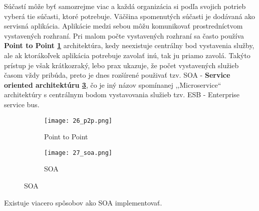 Súčastí môže byť samozrejme viac a každá organizácia si podľa svojich potrieb vyberá tie  súčasti, ktoré potrebuje. Väčšina spomenutých súčasti je dodávaná ako servisná aplikácia. Aplikácie medzi sebou môžu komunikovať prostredníctvom vystavených rozhraní. Pri malom počte vystavených rozhraní sa často používa \textbf{Point to Point \ref{26_p2p}} architektúra, kedy neexistuje centrálny bod vystavenia služby, ale ak ktorákoľvek aplikácia potrebuje zavolať inú, tak ju priamo zavolá. Takýto prístup je však krátkozraký, lebo prax ukazuje, že počet vystavených služieb časom vždy pribúda, preto je dnes rozšírené použivať tzv. SOA - \textbf{Service oriented architektúru \ref{27_soa}}, čo je iný názov spomínanej ,,Microservice`` architektúry s centrálnym bodom vystavovania služieb tzv. ESB - Enterprise service bus.
\begin{figure}[!htbp]
\centering
\begin{subfigure}{0.5\linewidth}
\texttt{[image: 26\_p2p.png]}
\caption{Point to Point \cite{IOT13}}
\label{26_p2p}
\end{subfigure}%
\begin{subfigure}{0.5\linewidth}
\texttt{[image: 27\_soa.png]}
\caption{SOA \cite{IOT13}}
\label{27_soa}
\end{subfigure}
\end{figure}
Existuje viacero spôsobov ako SOA implementovať. 
